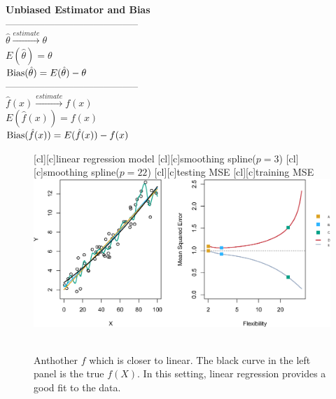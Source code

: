 \documentclass[12pt,a4paper]{article}%
\theoremstyle{definition}
\theoremstyle{plain}
\numberwithin{equation}{section}
\begin{document}
\begin{framed}
\textbf{Unbiased Estimator and Bias}\\
----------------------------------------- \\
$\hat{\theta}\stackrel{estimate}{\longrightarrow} \theta $ \\
$E(\hat{\theta})= \theta$ \\
${\rm Bias}(\hat{\theta}) = E(\hat{\theta}) - \theta $ \\
----------------------------------------- \\
$\hat{f}(x)\stackrel{estimate}{\longrightarrow} f(x)$\\
$E(\hat{f}(x))= f(x)$ \\
${\rm Bias}(\hat{f}(x)) = E(\hat{f}(x)) - f(x) $ \\
\end{framed}


\begin{figure}[H]
\centering
{}[cl][c]{\tiny linear regression model}
[cl][c]{\tiny smoothing spline($p=3$)}
[cl][c]{\tiny smoothing spline($p=22$)}
[cl][c]{\tiny testing MSE}
[cl][c]{\tiny training MSE}
\includegraphics[scale=0.7]{images//2_10.eps}
\\~\\
\caption{Anthother $f$ which is closer to linear. The black curve in the left panel is the true $f(X)$. In this setting, linear regression provides a good fit to the data.}\label{figure-2.10}
\end{figure}
\end{document}
